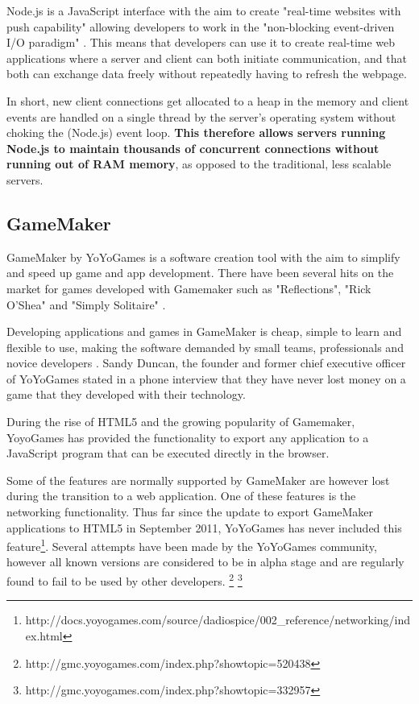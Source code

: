 \documentclass[bsc,frontabs,twoside,singlespacing,parskip,deptreport]{infthesis}     %
\begin{document}
Node.js is a JavaScript interface with the aim to create "real-time websites with push capability" allowing developers to work in the "non-blocking event-driven I/O paradigm" \cite{Why_Nodejs}. This means that developers can use it to create real-time web applications where a server and client can both initiate communication, and that both can exchange data freely without repeatedly having to refresh the webpage.

In short, new client connections get allocated to a heap in the memory and client events are handled on a single thread by the server's operating system without choking the (Node.js) event loop. \textbf{This therefore allows servers running Node.js to maintain thousands of concurrent connections without running out of RAM memory}\cite{Node_Stress_Test}\cite{NodeJS_Image}, as opposed to the traditional, less scalable servers.


\subsection{GameMaker}
GameMaker by YoYoGames is a software creation tool with the aim to simplify and speed up game and app development. There have been several hits on the market for games developed with Gamemaker such as "Reflections", "Rick O'Shea" and "Simply Solitaire" \cite{Gamemaker_DnD}.

Developing applications and games in GameMaker is cheap, simple to learn and flexible to use, making the software demanded by small teams, professionals and novice developers \cite{Mark_Overmars}. Sandy Duncan, the founder and former chief executive officer of YoYoGames stated in a phone interview that they have never lost money on a game that they developed with their technology\cite{Gamemaker_DnD}.

During the rise of HTML5 and the growing popularity of Gamemaker, YoyoGames has provided the functionality to export any application to a JavaScript program that can be executed directly in the browser\cite{GameMaker_Studio}.

Some of the features are normally supported by GameMaker are however lost during the transition to a web application. One of these features is the networking functionality. Thus far since the update to export GameMaker applications to HTML5 in September 2011, YoYoGames has never included this feature\footnote{http://docs.yoyogames.com/source/dadiospice/002\_reference/networking/index.html}. Several attempts have been made by the YoYoGames community, however all known versions are considered to be in alpha stage and are regularly found to fail to be used by other developers.
\footnote{http://gmc.yoyogames.com/index.php?showtopic=520438}
\footnote{http://gmc.yoyogames.com/index.php?showtopic=332957}
\end{document}

